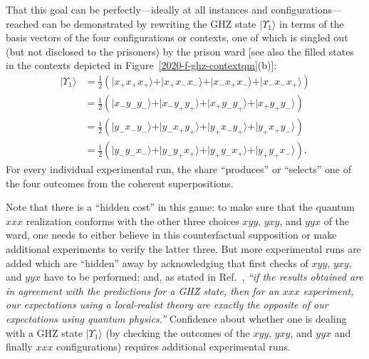 \documentclass[sn-mathphys]{sn-jnl}%
\theoremstyle{thmstyleone}%
\theoremstyle{thmstyletwo}%
\theoremstyle{thmstylethree}%
\begin{document}
That this goal can be perfectly---ideally at all instances and configurations---reached
can be demonstrated by rewriting the
GHZ state $\vert \Upsilon_1 \rangle $
in terms of the basis vectors of the four configurations or contexts,
one of which is singled out (but not disclosed to the prisoners) by the prison ward
[see also the filled states in the contexts depicted in Figure~\ref{2020-f-ghz-contextqm}(b)]:
\begin{equation}
\begin{aligned}
\vert \Upsilon_1 \rangle
&=  \frac{1}{2}
\left(
\vert x_+  x_+  x_+  \rangle +
\vert x_+  x_-  x_-  \rangle +
\vert x_-  x_+  x_-  \rangle +
\vert x_-  x_-  x_+  \rangle
\right)  \\
&=  \frac{1}{2}
\left(
\vert x_-  y_-  y_-  \rangle +
\vert x_-  y_+  y_+  \rangle +
\vert x_+  y_-  y_+  \rangle +
\vert x_+  y_+  y_-  \rangle
\right)  \\
&=  \frac{1}{2}
\left(
\vert y_-  x_-  y_-  \rangle +
\vert y_-  x_+  y_+  \rangle +
\vert y_+  x_-  y_+  \rangle +
\vert y_+  x_+  y_-  \rangle
\right)  \\
&=  \frac{1}{2}
\left(
\vert  y_-  y_-  x_-  \rangle +
\vert  y_-  y_+  x_+  \rangle +
\vert  y_+  y_-  x_+  \rangle +
\vert  y_+  y_+  x_-  \rangle
\right)
.
\end{aligned}
\label{2020-ex-rew-ghz}
\end{equation}
For every individual experimental run,
the share ``produces'' or ``selects'' one of the four outcomes from the coherent superpositions.

Note that there is a ``hidden cost''  in this game:
to make sure that the quantum $xxx$ realization conforms with the other three choices  $xyy$, $yxy$, and $yyx$
of the ward, one needs to either believe in this counterfactual supposition
or make additional experiments to verify the latter three.
But more experimental runs are added which are ``hidden'' away by acknowledging
that first checks of $xyy$, $yxy$, and $yyx$ have to be performed; and, as stated in Ref.~\cite[p.~517]{panbdwz},
{\it ``if the results obtained are in agreement with the predictions for a GHZ
state, then for an $xxx$ experiment, our expectations
using a local-realist theory are exactly the opposite of our expectations
using quantum physics.''}
Confidence about whether one is dealing with a GHZ state $\vert \Upsilon_1 \rangle $
(by checking the outcomes of the $xyy$, $yxy$, and $yyx$ and finally $xxx$ configurations)
requires additional experimental runs.
\end{document}
